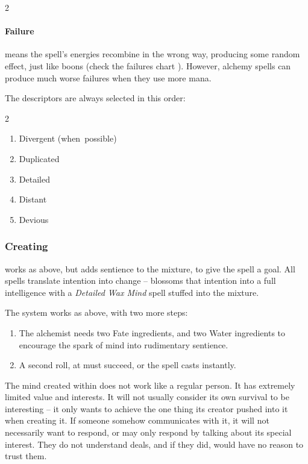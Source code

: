 \begin{multicols}{2}
\paragraph{Failure}
\label{alchemyFailure}
means the spell's energies recombine in the wrong way, producing some random effect, just like \glspl{boon} (check the failures chart ).
However, \gls{alchemy} \glspl{spell} can produce much worse failures when they use more mana.

The \glspl{descriptor} are always selected in this order:

\begin{multicols}{2}
  \begin{enumerate}
  \raggedright
    \item
    Divergent (when~possible)
    \item
    Duplicated
    \item
    Detailed
    \item
    Distant
    \item
    Devious
  \end{enumerate}
\end{multicols}

\subsubsection{Creating }
works as above, but adds sentience to the mixture, to give the spell a goal.
All spells translate intention into change --  blossoms that intention into a full intelligence with a \textit{Detailed Wax Mind} spell stuffed into the mixture.

The system works as above, with two more steps:

\begin{enumerate}
  \item
  The alchemist needs two Fate \glspl{ingredient}, and two Water \glspl{ingredient} to encourage the spark of mind into rudimentary sentience.
  \item
  A second roll, at \tn[9] must succeed, or the spell casts instantly.
\end{enumerate}

The mind created within  does not work like a regular person.
It has extremely limited value and interests.
It will not usually consider its own survival to be interesting -- it only wants to achieve the one thing its creator pushed into it when creating it.
If someone somehow communicates with it, it will not necessarily want to respond, or may only respond by talking about its special interest.
They do not understand deals, and if they did, would have no reason to trust them.

\end{multicols}
